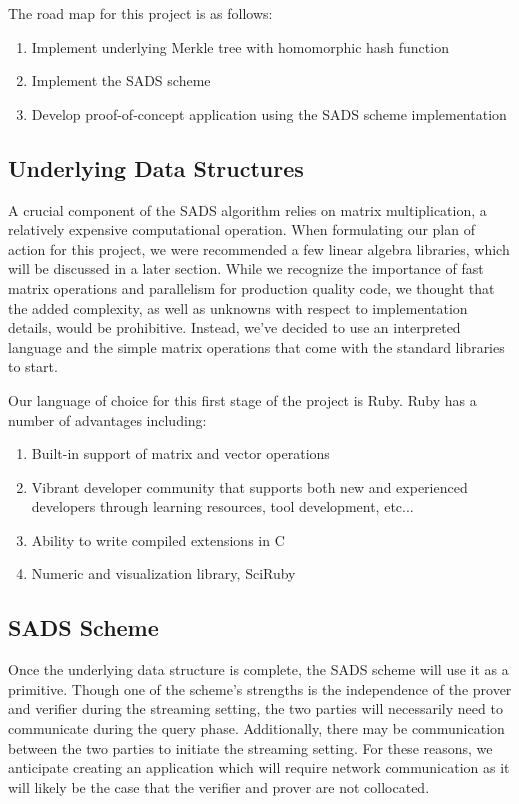 \documentclass[11pt, letterpaper, oneside]{article}
\begin{document}
	The road map for this project is as follows:
	\begin{enumerate}
	\item Implement underlying Merkle tree with homomorphic hash function
	\item Implement the SADS scheme
	\item Develop proof-of-concept application using the SADS scheme implementation
	\end{enumerate}

	\subsection{Underlying Data Structures}

	A crucial component of the SADS algorithm relies on matrix multiplication, a relatively expensive computational operation.
	When formulating our plan of action for this project, we were recommended a few linear algebra libraries, which will be discussed in a later section.
	While we recognize the importance of fast matrix operations and parallelism for production quality code, we thought that the added complexity, as well as unknowns with respect to implementation details, would be prohibitive.
	Instead, we've decided to use an interpreted language and the simple matrix operations that come with the standard libraries to start.

	Our language of choice for this first stage of the project is Ruby. Ruby has a number of advantages including:

	\begin{enumerate}
	\item Built-in support of matrix and vector operations
	\item Vibrant developer community that supports both new and experienced developers through learning resources, tool development, etc...
	\item Ability to write compiled extensions in C
	\item Numeric and visualization library, SciRuby
	\end{enumerate}

	\subsection{SADS Scheme}

	Once the underlying data structure is complete, the SADS scheme will use it as a primitive.
	Though one of the scheme's strengths is the independence of the prover and verifier during the streaming setting, the two parties will necessarily need to communicate during the query phase.
	Additionally, there may be communication between the two parties to initiate the streaming setting.
	For these reasons, we anticipate creating an application which will require network communication as it will likely be the case that the verifier and prover are not collocated.
\end{document}
